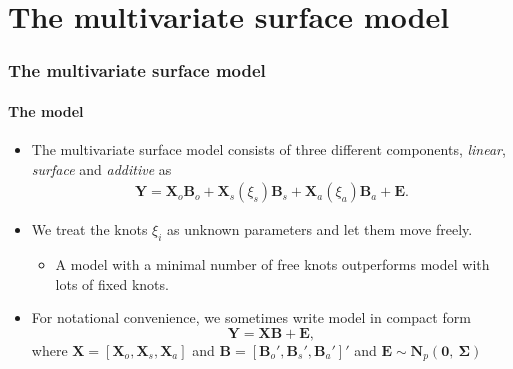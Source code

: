 \documentclass[10pt]{beamer}
\begin{document}
\section{The multivariate surface model}
\begin{frame}
  \frametitle{The multivariate surface model}
  \framesubtitle{The model}
  \begin{itemize}
  \item The multivariate surface model consists of three different components,
    {\color{blue}\emph{linear}}, {\color{blue}\emph{surface}} and
    {\color{blue}\emph{additive}} as
    \[\begin{gathered}
      \bm{Y}=\bm{X}_o\bm{B}_o+
      \bm{X}_s(\xi_s)\bm{B}_s+\bm{X}_a(\xi_a)\bm{B}_a + \bm{E}.
    \end{gathered}\]
  \item We treat the knots $\xi_i$ as unknown parameters and let them move
    freely.
    \begin{itemize}
    \item A model with a minimal number of free knots outperforms model with lots
      of fixed knots.
    \end{itemize}
  \item For notational convenience, we sometimes write model in compact form
    \[
    \bm{Y}=\bm{X}\bm{B}+\bm{E},
    \]
    where $\bm{X}=[\bm{X}_{o},\bm{X}_{s},\bm{X}_{a}]$ and
    $\bm{B}=[{\bm{B}_{o}}',{\bm{B}_{s}}',{\bm{B}_{a}}']'$ and $\bm{E}\sim \bm{N}_p(\bm{0},~\bm{\Sigma})$
  \end{itemize}
\end{frame}
\end{document}
